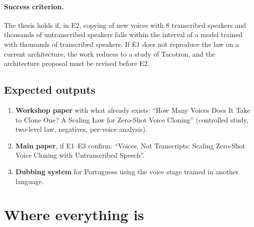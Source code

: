 \documentclass[a4paper,11pt]{article}
\begin{document}
\paragraph{Success criterion.} The thesis holds if, in E2, copying of new voices with 8 transcribed speakers and thousands of untranscribed speakers falls within the interval of a model trained with thousands of transcribed speakers. If E1 does not reproduce the law on a current architecture, the work reduces to a study of Tacotron, and the architecture proposal must be revised before E2.

\subsection{Expected outputs}
\begin{enumerate}
\item \textbf{Workshop paper} with what already exists: ``How Many Voices Does It Take to Clone One? A Scaling Law for Zero-Shot Voice Cloning'' (controlled study, two-level law, negatives, per-voice analysis).
\item \textbf{Main paper}, if E1--E3 confirm: ``Voices, Not Transcripts: Scaling Zero-Shot Voice Cloning with Untranscribed Speech''.
\item \textbf{Dubbing system} for Portuguese using the voice stage trained in another language.
\end{enumerate}

\section{Where everything is}
\end{document}
